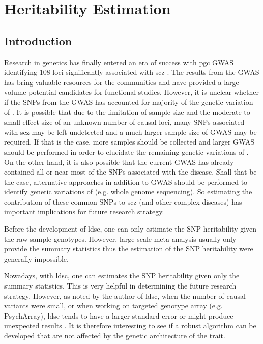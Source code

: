\chapter{Heritability Estimation}
\label{heritabilityChapter}
	\section{Introduction}
	Research in  genetics has finally entered an era of success with \gls{pgc}  \gls{GWAS} identifying 108 loci significantly associated with \gls{scz} \citep{Ripke2014}.
	The results from the \gls{GWAS} has bring valuable resources for the communities and have provided a large volume potential candidates for functional studies. 
	However, it is unclear whether if the \glspl{SNP} from the \gls{GWAS} has accounted for majority of the genetic variation of .
	It is possible that due to the limitation of sample size and the moderate-to-small effect size of an unknown number of causal loci, many \glspl{SNP} associated with \gls{scz} may be left undetected and a much larger sample size of \gls{GWAS} may be required. 
	If that is the case, more samples should be collected and larger \gls{GWAS} should be performed in order to elucidate the remaining genetic variations of .
	On the other hand, it is also possible that the current \gls{GWAS} has already contained all or near most of the \glspl{SNP} associated with the disease. 
	Shall that be the case, alternative approaches in addition to \gls{GWAS} should be performed to identify genetic variations of  (e.g. whole genome sequencing).
	So estimating the contribution of these common \glspl{SNP} to \gls{scz} (and other complex diseases) has important implications for future research strategy. 
	
	Before the development of \gls{ldsc}, one can only estimate the \gls{SNP} heritability given the raw sample genotypes. 
	However, large scale meta analysis usually only provide the summary statistics thus the estimation of the \gls{SNP} heritability were generally impossible.
	
	Nowadays, with \gls{ldsc}, one can estimates the \gls{SNP} heritability given only the summary statistics. 
	This is very helpful in determining the future research strategy.
	However, as noted by the author of \gls{ldsc}, when the number of causal variants were small, or when working on targeted genotype array (e.g. PsychArray), \gls{ldsc} tends to have a larger standard error or might produce unexpected results \citep{Bulik-Sullivan2015}.
	It is therefore interesting to see if a robust algorithm can be developed that are not affected by the genetic architecture of the trait.
	
